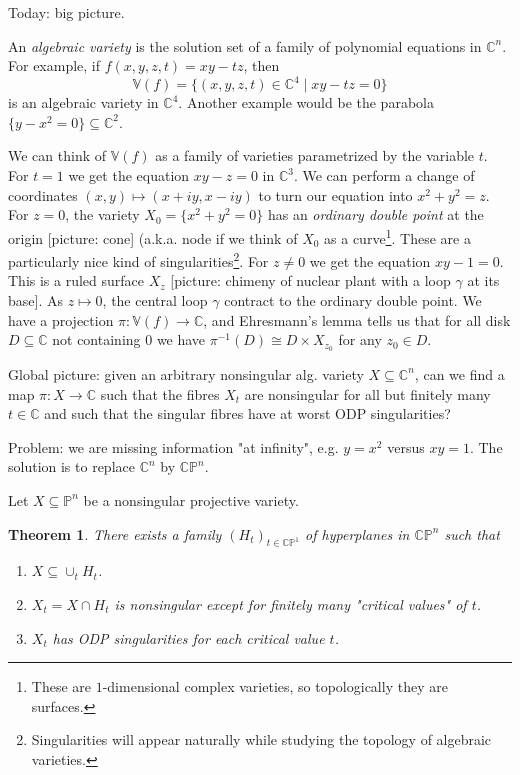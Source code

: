 \documentclass[11pt,A4]{article}
\theoremstyle{plain}
\newtheorem{thm}{Theorem}[section]
\theoremstyle{definition}
\theoremstyle{remark}
\newcommand{\1}{\mathbbm{1}}
\begin{document}
Today: big picture.

An \textit{algebraic variety} is the solution set of a family of polynomial equations in $\mathbb{C}^{n}$.
For example, if $f(x,y,z,t)=xy-tz$, then
\[ \mathbb{V}(f)=\{(x,y,z,t)\in \mathbb{C}^{4}\mid xy-tz=0\} \]
is an algebraic variety in $\mathbb{C}^{4}$.
Another example would be the parabola $\{ y-x^{2}=0\}\subseteq \mathbb{C}^{2}$.

We can think of $\mathbb{V}(f)$ as a family of varieties parametrized by the variable $t$.
For $t=1$ we get the equation $xy-z=0$ in $\mathbb{C}^{3}$.
We can perform a change of coordinates $(x,y)\mapsto (x+iy,x-iy)$ to turn our equation into $x^{2}+y^{2}=z$.
For $z=0$, the variety $X_{0}=\{x^{2}+y^{2}=0\}$ has an \textit{ordinary double point} at the origin [picture: cone] (a.k.a. node if we think of $X_{0}$ as a curve\footnote{These are $1$-dimensional complex varieties, so topologically they are surfaces.}.
These are a particularly nice kind of singularities\footnote{Singularities will appear naturally while studying the topology of algebraic varieties.}.
For $z\neq 0$ we get the equation $xy-1=0$.
This is a ruled surface $X_{z}$ [picture: chimeny of nuclear plant with a loop $\gamma$ at its base].
As $z\mapsto 0$, the central loop $\gamma$ contract to the ordinary double point.
We have a projection $\pi\colon \mathbb{V}(f)\to \mathbb{C}$, and Ehresmann's lemma tells us that for all disk $D\subseteq \mathbb{C}$ not containing $0$ we have $\pi^{-1}(D)\cong D\times X_{z_{0}}$ for any $z_{0}\in D$.

Global picture: given an arbitrary nonsingular alg. variety $X\subseteq \mathbb{C}^{n}$, can we find a map $\pi\colon X\to \mathbb{C}$ such that the fibres $X_{t}$ are nonsingular for all but finitely many $t\in \mathbb{C}$ and such that the singular fibres have at worst ODP singularities?

Problem: we are missing information "at infinity", e.g. $y=x^{2}$ versus $xy=1$.
The solution is to replace $\mathbb{C}^{n}$ by $\mathbb{C}\mathbb{P}^{n}$.

Let $X\subseteq\mathbb{P}^{n}$ be a nonsingular projective variety.

\begin{thm}
    There exists a family $(H_{t})_{t\in \mathbb{C}\mathbb{P}^{1}}$ of hyperplanes in $\mathbb{C}\mathbb{P}^{n}$ such that
    \begin{enumerate}
	\item $X\subseteq \cup_{t}H_{t}$.
	\item $X_{t}=X\cap H_{t}$ is nonsingular except for finitely many "critical values" of $t$.
	\item $X_{t}$ has ODP singularities for each critical value $t$.
    \end{enumerate}
\end{thm}
\end{document}
